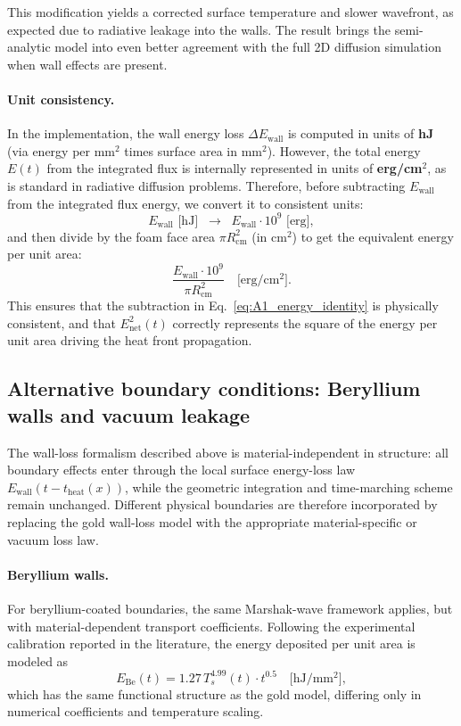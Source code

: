\documentclass{article}
\begin{document}
This modification yields a corrected surface temperature and slower wavefront, as expected due to radiative leakage into the walls. The result brings the semi-analytic model into even better agreement with the full 2D diffusion simulation when wall effects are present.

\paragraph{Unit consistency.}
In the implementation, the wall energy loss $\Delta E_{\text{wall}}$ is computed in units of \textbf{hJ} (via energy per mm$^2$ times surface area in mm$^2$). However, the total energy $E(t)$ from the integrated flux is internally represented in units of \textbf{erg/cm$^2$}, as is standard in radiative diffusion problems. Therefore, before subtracting $E_{\text{wall}}$ from the integrated flux energy, we convert it to consistent units:
\[
E_{\text{wall}} \text{ [hJ]} \;\;\longrightarrow\;\; E_{\text{wall}} \cdot 10^9 \text{ [erg]},
\]
and then divide by the foam face area $\pi R_{\text{cm}}^2$ (in cm$^2$) to get the equivalent energy per unit area:
\[
\frac{E_{\text{wall}} \cdot 10^9}{\pi R_{\text{cm}}^2} \quad \text{[erg/cm$^2$]}.
\]
This ensures that the subtraction in Eq.~\eqref{eq:A1_energy_identity} is physically consistent, and that $E_{\text{net}}^2(t)$ correctly represents the square of the energy per unit area driving the heat front propagation.

\subsection{Alternative boundary conditions: Beryllium walls and vacuum leakage}

The wall-loss formalism described above is material-independent in structure: all boundary effects enter through the local surface energy-loss law $E_{\text{wall}}(t-t_{\text{heat}}(x))$, while the geometric integration and time-marching scheme remain unchanged. Different physical boundaries are therefore incorporated by replacing the gold wall-loss model with the appropriate material-specific or vacuum loss law.

\paragraph{Beryllium walls.}
For beryllium-coated boundaries, the same Marshak-wave framework applies, but with material-dependent transport coefficients. Following the experimental calibration reported in the literature, the energy deposited per unit area is modeled as
\begin{equation}
E_{\mathrm{Be}}(t) = 1.27\,T_s^{4.99}(t)\cdot t^{0.5} \quad \text{[hJ/mm$^2$]},
\end{equation}
which has the same functional structure as the gold model, differing only in numerical coefficients and temperature scaling. 
\end{document}
